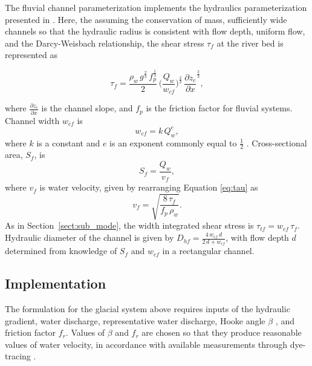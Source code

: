 \documentclass[11pt]{article}
\begin{document}
\begin{spacing}{1}
  The fluvial channel parameterization implements the hydraulics parameterization presented in \citet{tucker1997}.
  Here, the assuming the conservation of mass, sufficiently wide channels so that the hydraulic radius is consistent with flow depth, uniform flow, and the Darcy-Weisbach relationship,
  the shear stress $\tau_f$ at the river bed is represented as
  \begin{linenomath*}
    \begin{equation}
      \label{eq:DW_tau}
      \tau_f=\frac{\rho_w\,g^{\frac{2}{3}}\,f_p^{\frac{1}{3}}}{2}\, \Big(\frac{Q_w}{w_{cf}} \Big)^{\frac{2}{3}} \,\frac{\partial z_c}{\partial x}^{\frac{2}{3}},
    \end{equation}
  \end{linenomath*}
  where $\frac{\partial z_c}{\partial x}$ is the channel slope, and $f_p$ is the friction factor for fluvial systems.
  Channel width $w_{cf}$ is 
  \begin{equation}
    \label{eq:wcf}
    w_{cf} = k \, Q_w^e,
  \end{equation}
  where $k$ is a constant and $e$ is an exponent commonly equal to $\frac{1}{2}$ \citep{leopold1953}.
  Cross-sectional area, $ S_f$, is 
  \begin{equation}
    \label{eq:Sf}
    S_f = \frac{Q_w}{v_f},
  \end{equation}
  where $v_f$ is water velocity, given by rearranging Equation \ref{eq:tau} as
 \begin{equation}
    \label{eq:vf}
    v_f = \sqrt{\frac{8\,\tau_f}{f_p\,\rho_w}}.
  \end{equation}
  As in Section~\ref{sect:sub_mode}, the width integrated shear stress is $\tau_{tf}=w_{cf}\,\tau_f$.
  Hydraulic diameter of the channel is given by $D_{hf} = \frac{4\,w_{cf}\,d}{2\,d+w_{cf}}$, with flow depth $d$ determined from knowledge of $S_f$ and $w_{cf}$ in a rectangular channel.
  
  \subsection{Implementation}
  
  The formulation for the glacial system above requires inputs of the hydraulic gradient, water discharge, representative water discharge, Hooke angle $\beta$ \citep{hooke1990}, and friction factor $f_r$.
  Values of $\beta$ and $f_r$ are chosen so that they produce reasonable values of water velocity, in accordance with available measurements through dye-tracing \citep[Section~\ref{sect:sub_mode}, Figure~\ref{fig:model_outs}; e.g.][]{werder2010}.
  

\end{spacing}
\end{document}
